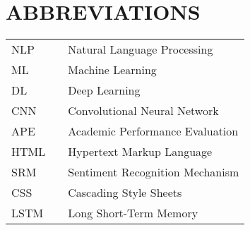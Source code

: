 \chapter*{ABBREVIATIONS}
\begin{tabular}{lll}
NLP	&	\hspace{0.75in}		&Natural Language Processing\\
ML          &    \hspace{0.75in} 	&Machine Learning\\
DL	&	\hspace{0.75in}		&Deep Learning\\
CNN	&	\hspace{0.75in}		&Convolutional Neural Network\\
APE	&	\hspace{0.75in}		&Academic Performance Evaluation\\
HTML &	\hspace{0.75in}		&Hypertext Markup Language\\
SRM	&	\hspace{0.75in}		&Sentiment Recognition Mechanism\\
CSS	&	\hspace{0.75in}		&Cascading Style Sheets\\
LSTM &	\hspace{0.75in}		&Long Short-Term Memory\\


\end{tabular}